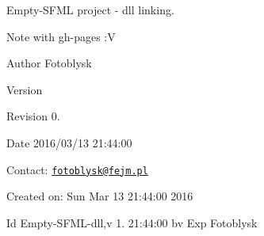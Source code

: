 Empty-\/\+S\+F\+M\+L project -\/ dll linking.\begin{DoxyNote}{Note}
with gh-\/pages \+:V
\end{DoxyNote}
\begin{DoxyAuthor}{Author}
Fotoblysk
\end{DoxyAuthor}
\begin{DoxyVersion}{Version}

\end{DoxyVersion}
\begin{DoxyParagraph}{Revision}
0. 
\end{DoxyParagraph}


\begin{DoxyDate}{Date}
2016/03/13 21\+:44\+:00
\end{DoxyDate}
Contact\+: \href{mailto:fotoblysk@fejm.pl}{\tt fotoblysk@fejm.\+pl}

Created on\+: Sun Mar 13 21\+:44\+:00 2016

\begin{DoxyParagraph}{Id}
Empty-\/\+S\+F\+M\+L-\/dll,v 1. 21\+:44\+:00 bv Exp Fotoblysk
\end{DoxyParagraph}

